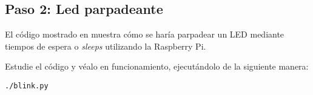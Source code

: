 %
%


\subsection{Paso 2: Led parpadeante}%
\label{sec:step2}
El código mostrado en  muestra cómo se haría parpadear un LED mediante tiempos de espera o \emph{sleeps} utilizando la Raspberry Pi.

\smallskip

\smallskip

Estudie el código y véalo en funcionamiento, ejecutándolo de la siguiente manera:
\begin{Verbatim}[fontsize=\footnotesize]
./blink.py
\end{Verbatim}

